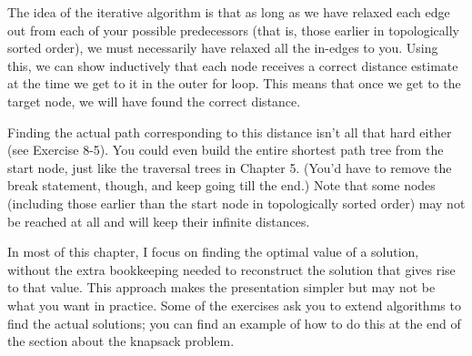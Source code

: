 The idea of the iterative algorithm is that as long as we have relaxed each edge out from each of your possible predecessors (that is, those earlier in topologically sorted order), we must necessarily have relaxed all the in-edges to you. Using this, we can show inductively that each node receives a correct distance estimate at the time we get to it in the outer for loop. This means that once we get to the target node, we will have found the correct distance.

Finding the actual path corresponding to this distance isn't all that hard either (see Exercise 8-5). You could even build the entire shortest path tree from the start node, just like the traversal trees in Chapter 5. (You'd have to remove the break statement, though, and keep going till the end.) Note that some nodes (including those earlier than the start node in topologically sorted order) may not be reached at all and will keep their infinite distances.


\begin{note}
In most of this chapter, I focus on finding the optimal value of a solution, without the extra bookkeeping needed to reconstruct the solution that gives rise to that value. This approach makes the presentation simpler but may not be what you want in practice. Some of the exercises ask you to extend algorithms to find the actual solutions; you can find an example of how to do this at the end of the section about the knapsack problem. 
\end{note}


